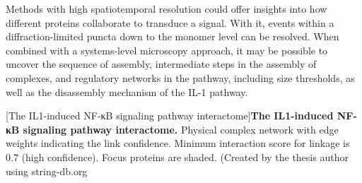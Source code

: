 Methods with high spatiotemporal resolution could offer insights into how different proteins collaborate to transduce a signal. With it, events within a diffraction-limited puncta down to the monomer level can be resolved. When combined with a systems-level microscopy approach, it may be possible to uncover the sequence of assembly, intermediate steps in the assembly of complexes, and regulatory networks in the pathway, including size thresholds, as well as the disassembly mechanism of the IL-1 pathway.

\begin{centering}
\captionsetup{parbox=none}
[The IL1{\textbeta}-induced NF-κB signaling pathway interactome]{\textbf{The IL1{\textbeta}-induced NF-κB signaling pathway interactome.} Physical complex network with edge weights indicating the link confidence. Minimum interaction score for linkage is 0.7 (high confidence). Focus proteins are shaded. (Created by the thesis author using string-db.org\autocite{Szklarczyk_2019}}
\label{img:interactome}
\end{centering}
 

